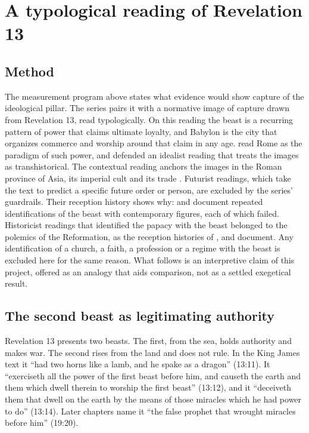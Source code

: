 \documentclass[11pt,letterpaper]{article}
\theoremstyle{definition}
\theoremstyle{remark}
\begin{document}
\section{A typological reading of Revelation 13}
\label{sec:revelation}

\subsection{Method}

The measurement program above states what evidence would show capture of the ideological pillar. The series pairs it with a normative image of capture drawn from Revelation 13, read typologically. On this reading the beast is a recurring pattern of power that claims ultimate loyalty, and Babylon is the city that organizes commerce and worship around that claim in any age. \citet{bauckham1993} read Rome as the paradigm of such power, and \citet{beale1999} defended an idealist reading that treats the images as transhistorical. The contextual reading anchors the images in the Roman province of Asia, its imperial cult and its trade \citep{koester2014,friesen2001,kraybill1996}. Futurist readings, which take the text to predict a specific future order or person, are excluded by the series' guardrails. Their reception history shows why: \citet{fuller1995} and \citet{boyer1992} document repeated identifications of the beast with contemporary figures, each of which failed. Historicist readings that identified the papacy with the beast belonged to the polemics of the Reformation, as the reception histories of \citet{emmerson1992}, \citet{mcginn1998} and \citet{kovacs2004} document. Any identification of a church, a faith, a profession or a regime with the beast is excluded here for the same reason. What follows is an interpretive claim of this project, offered as an analogy that aids comparison, not as a settled exegetical result.

\subsection{The second beast as legitimating authority}

Revelation 13 presents two beasts. The first, from the sea, holds authority and makes war. The second rises from the land and does not rule. In the King James text it ``had two horns like a lamb, and he spake as a dragon'' (13:11). It ``exerciseth all the power of the first beast before him, and causeth the earth and them which dwell therein to worship the first beast'' (13:12), and it ``deceiveth them that dwell on the earth by the means of those miracles which he had power to do'' (13:14). Later chapters name it ``the false prophet that wrought miracles before him'' (19:20).
\end{document}
